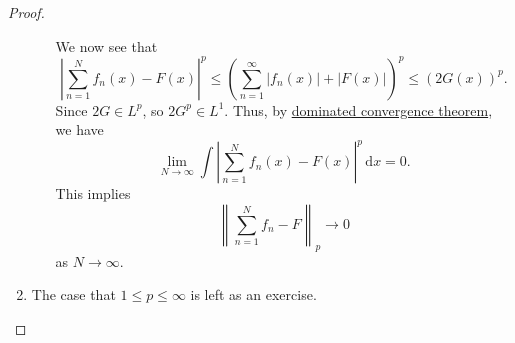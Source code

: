 \begin{proof}
\begin{enumerate}
\begin{enumerate}
			            \par We now see that
			            \[
				            \left\vert \sum\limits_{n=1}^{N} f_{n} (x) - F(x) \right\vert ^p \leq \left(\sum\limits_{n=1}^{\infty} \left\vert f_{n} (x) \right\vert + \left\vert F(x) \right\vert \right)^p \leq (2G(x))^p.
			            \]
			            Since \(2G\in L^p\), so \(2G^p\in L^1\). Thus, by \hyperref[thm:dominated-convergence-theorem]{dominated convergence theorem}, we have
			            \[
				            \lim\limits_{N \to \infty} \int \left\vert \sum\limits_{n=1}^{N} f_{n} (x)- F(x) \right\vert ^p \,\mathrm{d} x = 0.
			            \]
			            This implies
			            \[
				            \left\lVert \sum\limits_{n=1}^{N} f_{n} - F\right\rVert _p \to 0
			            \]
			            as \(N\to \infty \).
		      \end{enumerate}
		\item The case that \(1\leq p\leq \infty \) is left as an exercise.
	\end{enumerate}
\end{proof}